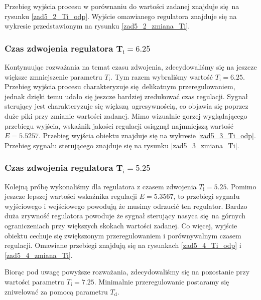 Przebieg wyjścia procesu w porównaniu do wartości zadanej znajduje się na rysunku \ref{zad5_2_Ti_odp}.
Wyjście omawianego regulatora znajduje się na wykresie przedstawionym na rysunku \ref{zad5_2_zmiana_Ti}. 

\subsubsection{Czas zdwojenia regulatora $\mathbf{T_{\mathrm{i}}}=\num{6,25}$}
Kontynuując rozważania na temat czasu zdwojenia, zdecydowaliśmy się na jeszcze większe zmniejszenie 
parametru $T_{\mathrm{i}}$. Tym razem wybraliśmy wartość $T_{\mathrm{i}}=\num{6,25}$. Przebieg 
wyjścia procesu charakteryzuje się delikatnym przeregulowaniem, jednak dzięki temu udało się
jeszcze bardziej zredukować czas regulacji. Sygnał sterujący jest charakteryzuje się
większą agresywnością, co objawia się poprzez duże piki przy zmianie wartości zadanej.
Mimo wizualnie gorzej wyglądającego przebiegu wyjścia, wskaźnik jakości regulacji osiągnął najmniejszą
wartość $E=\num{5,5257}$. Przebieg wyjścia obiektu znajduje się na wykresie \ref{zad5_3_Ti_odp}. 
Przebieg sygnału sterującego znajduje się na rysunku \ref{zad5_3_zmiana_Ti}.

\subsubsection{Czas zdwojenia regulatora $\mathbf{T_{\mathrm{i}}}=\num{5,25}$}
Kolejną próbę wykonaliśmy dla regulatora z czasem zdwojenia $T_{\mathrm{i}}=\num{5,25}$. Pomimo
jeszcze lepszej wartości wskaźnika regulacji $E=\num{5,3567}$, to przebiegi sygnału wyjściowego i wejściowego
powodują że musimy odrzucić ten regulator. Bardzo duża zrywność regulatora powoduje że 
sygnał sterujący nasyca się na górnych ograniczeniach przy większych skokach wartości zadanej. Co więcej,
wyjście obiektu cechuje się zwiększonym przeregulowaniem i porównywalnym czasem regulacji. Omawiane przebiegi
znajdują się na rysunkach \ref{zad5_4_Ti_odp} i \ref{zad5_4_zmiana_Ti}. 

Biorąc pod uwagę powyższe rozważania, zdecydowaliśmy się na pozostanie przy wartości parametru $T_{\mathrm{i}} = \num{7,25}$.
Minimalnie przeregulowanie postaramy się zniwelować za pomocą parametru $T_{\mathrm{d}}$. 


